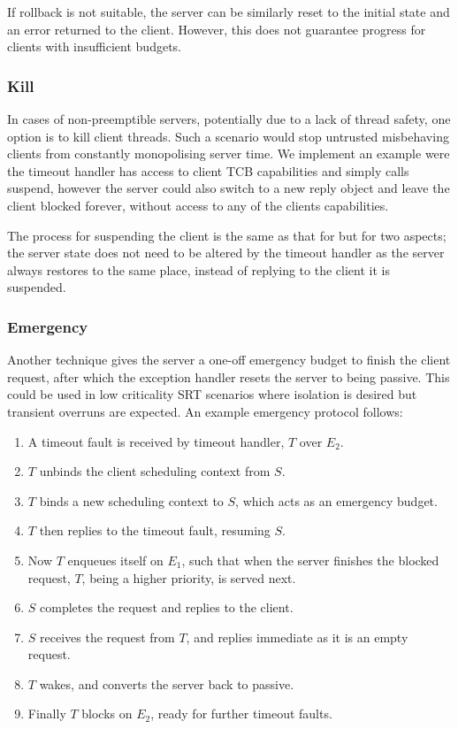 If rollback is not suitable, the server can be similarly reset to the initial state and an error
returned to the client. However, this does not guarantee progress for clients with insufficient
budgets.

\subsubsection{Kill}

In cases of non-preemptible servers, potentially due to a lack of thread safety, one option is to
kill client threads. Such a scenario would stop untrusted misbehaving clients from constantly
monopolising server time.  We implement an example were the timeout handler has access to client \gls{TCB}
capabilities and simply calls suspend, however the server could also switch to a new reply object
and leave the client blocked forever, without access to any of the clients capabilities. 

The process for suspending the client is the same as that for  but for two aspects;
the server state does not need to be altered by the timeout handler as the server always 
restores to the same place, instead of replying to the client it is suspended.

\subsubsection{Emergency}

Another technique gives the server a one-off emergency budget to finish the client request, after
which the exception handler resets the server to being passive. This could be used in low
criticality \gls{SRT}
scenarios where isolation is desired but transient overruns are expected.
An example emergency protocol follows:

\begin{enumerate}\label{e:emergency}
    \item A timeout fault is received by timeout handler, $T$ over $E_{2}$.
    \item $T$ unbinds the client scheduling context from $S$.
    \item $T$ binds a new scheduling context to $S$, which acts as an emergency budget.
    \item $T$ then replies to the timeout fault, resuming $S$.
    \item Now $T$ enqueues itself on $E_{1}$, such that when the server finishes the blocked request,
        $T$, being a higher priority, is served next.
    \item $S$ completes the request and replies to the client.
    \item $S$ receives the request from $T$, and replies immediate as it is an empty request.
    \item $T$ wakes, and converts the server back to passive.
    \item Finally $T$ blocks on $E_{2}$, ready for further timeout faults.
\end{enumerate}

